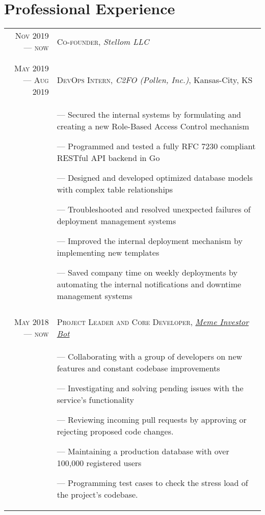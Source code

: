 \documentclass[letterpaper,10pt]{article}
\begin{document}
\section{Professional Experience}
\begin{tabular}{r|p{11cm}}
   \textsc{Nov 2019 --- now} &  \textsc{Co-founder}, \emph{Stellom LLC}\\&\footnotesize{
   } \\\multicolumn{2}{c}{}\\
  
  \textsc{May 2019 --- Aug 2019} &  \textsc{DevOps Intern}, \emph{C2FO (Pollen, Inc.)}, Kansas-City, KS\\&\footnotesize{
    --- Secured the internal systems by formulating and creating a new Role-Based Access Control mechanism
   
    --- Programmed and tested a fully RFC 7230 compliant RESTful API backend in Go 
    
    --- Designed and developed optimized database models with complex table relationships
    
    --- Troubleshooted and resolved unexpected failures of deployment management systems
    
    --- Improved the internal deployment mechanism by implementing new templates
    
    --- Saved company time on weekly deployments by automating the internal notifications and downtime management systems
  } \\\multicolumn{2}{c}{}\\
  
  \textsc{May 2018 --- now} &  \textsc{Project Leader and Core Developer}, \emph{\href{https://github.com/thecsw/memeinvestor_bot}{Meme Investor Bot}}\\&\footnotesize{
    --- Collaborating with a group of developers on new features and constant codebase improvements
    
    --- Investigating and solving pending issues with the service's functionality
    
    --- Reviewing incoming pull requests by approving or rejecting proposed code changes.
    
    --- Maintaining a production database with over 100,000 registered users
    
    --- Programming test cases to check the stress load of the project's codebase.

}
\end{tabular}
\end{document}

